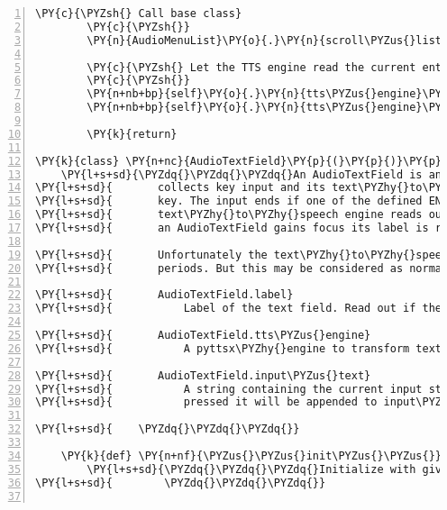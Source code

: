 \begin{Verbatim}[commandchars=\\\{\},numbers=left,firstnumber=1,stepnumber=1]
        \PY{c}{\PYZsh{} Call base class}
        \PY{c}{\PYZsh{}}
        \PY{n}{AudioMenuList}\PY{o}{.}\PY{n}{scroll\PYZus{}list}\PY{p}{(}\PY{n+nb+bp}{self}\PY{p}{,} \PY{n}{key}\PY{p}{)}

        \PY{c}{\PYZsh{} Let the TTS engine read the current entry}
        \PY{c}{\PYZsh{}}
        \PY{n+nb+bp}{self}\PY{o}{.}\PY{n}{tts\PYZus{}engine}\PY{o}{.}\PY{n}{say}\PY{p}{(}\PY{n+nb+bp}{self}\PY{o}{.}\PY{n}{list}\PY{p}{[}\PY{n+nb+bp}{self}\PY{o}{.}\PY{n}{list\PYZus{}index}\PY{p}{]}\PY{p}{)}
        \PY{n+nb+bp}{self}\PY{o}{.}\PY{n}{tts\PYZus{}engine}\PY{o}{.}\PY{n}{runAndWait}\PY{p}{(}\PY{p}{)}

        \PY{k}{return}

\PY{k}{class} \PY{n+nc}{AudioTextField}\PY{p}{(}\PY{p}{)}\PY{p}{:}
    \PY{l+s+sd}{\PYZdq{}\PYZdq{}\PYZdq{}An AudioTextField is an acoustic widget for a text input field. It}
\PY{l+s+sd}{       collects key input and its text\PYZhy{}to\PYZhy{}speech engine reads out the entered}
\PY{l+s+sd}{       key. The input ends if one of the defined ENTER\PYZus{}KEYS is pressed and the}
\PY{l+s+sd}{       text\PYZhy{}to\PYZhy{}speech engine reads out the complete collected input string. When}
\PY{l+s+sd}{       an AudioTextField gains focus its label is read out.}

\PY{l+s+sd}{       Unfortunately the text\PYZhy{}to\PYZhy{}speech engine is not able to read single}
\PY{l+s+sd}{       periods. But this may be considered as normal text\PYZhy{}to\PYZhy{}speech behavior.}

\PY{l+s+sd}{       AudioTextField.label}
\PY{l+s+sd}{           Label of the text field. Read out if the field gains focus.}

\PY{l+s+sd}{       AudioTextField.tts\PYZus{}engine}
\PY{l+s+sd}{           A pyttsx\PYZhy{}engine to transform text to speech.}

\PY{l+s+sd}{       AudioTextField.input\PYZus{}text}
\PY{l+s+sd}{           A string containing the current input string. When a valid key is}
\PY{l+s+sd}{           pressed it will be appended to input\PYZus{}text. By default empty string.}

\PY{l+s+sd}{    \PYZdq{}\PYZdq{}\PYZdq{}}

    \PY{k}{def} \PY{n+nf}{\PYZus{}\PYZus{}init\PYZus{}\PYZus{}}\PY{p}{(}\PY{n+nb+bp}{self}\PY{p}{,} \PY{n}{label}\PY{p}{,} \PY{n}{tts\PYZus{}engine}\PY{p}{,} \PY{n}{input\PYZus{}text}\PY{o}{=}\PY{l+s}{\PYZdq{}}\PY{l+s}{\PYZdq{}}\PY{p}{)}\PY{p}{:}
        \PY{l+s+sd}{\PYZdq{}\PYZdq{}\PYZdq{}Initialize with given parameters.}
\PY{l+s+sd}{        \PYZdq{}\PYZdq{}\PYZdq{}}


\end{Verbatim}
